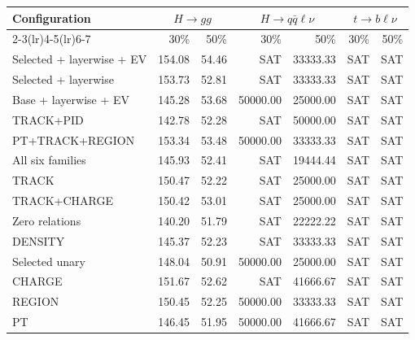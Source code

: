 \begin{table}[htbp]
\centering
\footnotesize
\setlength{\tabcolsep}{2.5pt}
\begin{tabularx}{\linewidth}{@{}Xrrrrrr@{}}
\toprule
Configuration & \multicolumn{2}{c}{$H\to gg$} & \multicolumn{2}{c}{$H\to q\bar q\ell\nu$} & \multicolumn{2}{c}{$t\to b\ell\nu$} \\
\cmidrule(lr){2-3}\cmidrule(lr){4-5}\cmidrule(lr){6-7}
 & 30\% & 50\% & 30\% & 50\% & 30\% & 50\% \\
\midrule
Selected + layerwise + EV & 154.08 & 54.46 & SAT & 33333.33 & SAT & SAT \\ %
Selected + layerwise & 153.73 & 52.81 & SAT & 33333.33 & SAT & SAT \\ %
Base + layerwise + EV & 145.28 & 53.68 & 50000.00 & 25000.00 & SAT & SAT \\ %
TRACK+PID & 142.78 & 52.28 & SAT & 50000.00 & SAT & SAT \\ %
PT+TRACK+REGION & 153.34 & 53.48 & 50000.00 & 33333.33 & SAT & SAT \\ %
All six families & 145.93 & 52.41 & SAT & 19444.44 & SAT & SAT \\ %
TRACK & 150.47 & 52.22 & SAT & 25000.00 & SAT & SAT \\ %
TRACK+CHARGE & 150.42 & 53.01 & SAT & 25000.00 & SAT & SAT \\ %
Zero relations & 140.20 & 51.79 & SAT & 22222.22 & SAT & SAT \\ %
DENSITY & 145.37 & 52.23 & SAT & 33333.33 & SAT & SAT \\ %
Selected unary & 148.04 & 50.91 & 50000.00 & 25000.00 & SAT & SAT \\ %
CHARGE & 151.67 & 52.62 & SAT & 41666.67 & SAT & SAT \\ %
REGION & 150.45 & 52.25 & 50000.00 & 33333.33 & SAT & SAT \\ %
PT & 146.45 & 51.95 & 50000.00 & 41666.67 & SAT & SAT \\ %

\end{tabularx}
\end{table}
